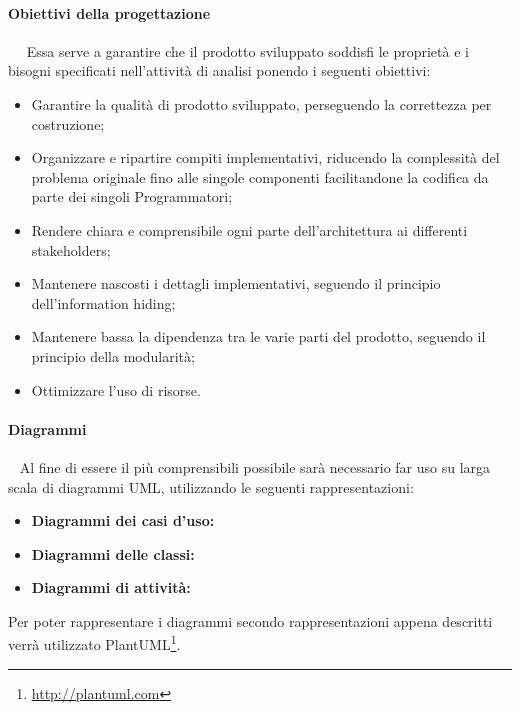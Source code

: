 	    \paragraph{Obiettivi della progettazione}~\newline ~\newline
	    Essa serve a garantire che il prodotto sviluppato soddisfi le proprietà e i bisogni specificati nell'attività di analisi ponendo i seguenti obiettivi:
	    \begin{itemize}
    	    \item Garantire la qualità di prodotto sviluppato, perseguendo la correttezza per costruzione;
            \item Organizzare e ripartire compiti implementativi, riducendo la complessità del problema originale fino alle singole componenti facilitandone la codifica da parte dei singoli Programmatori;
            \item Rendere chiara e comprensibile ogni parte dell'architettura ai differenti stakeholders;
            \item Mantenere nascosti i dettagli implementativi, seguendo il principio dell'information hiding;
            \item Mantenere bassa la dipendenza tra le varie parti del prodotto, seguendo il principio della modularità;
            \item Ottimizzare l’uso di risorse.
        \end{itemize}
	    
	    \paragraph{Diagrammi}~\newline
	    Al fine di essere il più comprensibili possibile sarà necessario far uso su larga scala di diagrammi UML, utilizzando le seguenti rappresentazioni:
	    \begin{itemize}
	        \item \textbf{Diagrammi dei casi d'uso:}
	        \item \textbf{Diagrammi delle classi:}
	        \item \textbf{Diagrammi di attività:}
	    \end{itemize}
	    Per poter rappresentare i diagrammi secondo rappresentazioni appena descritti verrà utilizzato PlantUML\footnote{\url{http://plantuml.com}}.
	    
